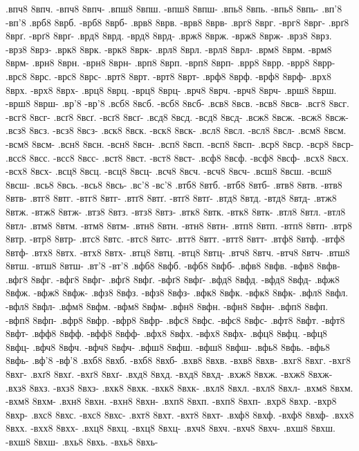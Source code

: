 {.впч8 8впч. -впч8 8впч-
.впш8 8впш. -впш8 8впш-
.впь8 8впь. -впь8 8впь-
.вп'8 -вп'8
.врб8 8врб. -врб8 8врб-
.врв8 8врв. -врв8 8врв-
.врг8 8врг. -врг8 8врг-
.врґ8 8врґ. -врґ8 8врґ-
.врд8 8врд. -врд8 8врд-
.врж8 8врж. -врж8 8врж-
.врз8 8врз. -врз8 8врз-
.врк8 8врк. -врк8 8врк-
.врл8 8врл. -врл8 8врл-
.врм8 8врм. -врм8 8врм-
.врн8 8врн. -врн8 8врн-
.врп8 8врп. -врп8 8врп-
.врр8 8врр. -врр8 8врр-
.врс8 8врс. -врс8 8врс-
.врт8 8врт. -врт8 8врт-
.врф8 8врф. -врф8 8врф-
.врх8 8врх. -врх8 8врх-
.врц8 8врц. -врц8 8врц-
.врч8 8врч. -врч8 8врч-
.врш8 8врш. -врш8 8врш-
.вр'8 -вр'8
.всб8 8всб. -всб8 8всб-
.всв8 8всв. -всв8 8всв-
.всг8 8всг. -всг8 8всг-
.всґ8 8всґ. -всґ8 8всґ-
.всд8 8всд. -всд8 8всд-
.всж8 8всж. -всж8 8всж-
.всз8 8всз. -всз8 8всз-
.вск8 8вск. -вск8 8вск-
.всл8 8всл. -всл8 8всл-
.всм8 8всм. -всм8 8всм-
.всн8 8всн. -всн8 8всн-
.всп8 8всп. -всп8 8всп-
.вср8 8вср. -вср8 8вср-
.всс8 8всс. -всс8 8всс-
.вст8 8вст. -вст8 8вст-
.всф8 8всф. -всф8 8всф-
.всх8 8всх. -всх8 8всх-
.всц8 8всц. -всц8 8всц-
.всч8 8всч. -всч8 8всч-
.всш8 8всш. -всш8 8всш-
.всь8 8всь. -всь8 8всь-
.вс'8 -вс'8
.втб8 8втб. -втб8 8втб-
.втв8 8втв. -втв8 8втв-
.втг8 8втг. -втг8 8втг-
.втґ8 8втґ. -втґ8 8втґ-
.втд8 8втд. -втд8 8втд-
.втж8 8втж. -втж8 8втж-
.втз8 8втз. -втз8 8втз-
.втк8 8втк. -втк8 8втк-
.втл8 8втл. -втл8 8втл-
.втм8 8втм. -втм8 8втм-
.втн8 8втн. -втн8 8втн-
.втп8 8втп. -втп8 8втп-
.втр8 8втр. -втр8 8втр-
.втс8 8втс. -втс8 8втс-
.втт8 8втт. -втт8 8втт-
.втф8 8втф. -втф8 8втф-
.втх8 8втх. -втх8 8втх-
.втц8 8втц. -втц8 8втц-
.втч8 8втч. -втч8 8втч-
.втш8 8втш. -втш8 8втш-
.вт'8 -вт'8
.вфб8 8вфб. -вфб8 8вфб-
.вфв8 8вфв. -вфв8 8вфв-
.вфг8 8вфг. -вфг8 8вфг-
.вфґ8 8вфґ. -вфґ8 8вфґ-
.вфд8 8вфд. -вфд8 8вфд-
.вфж8 8вфж. -вфж8 8вфж-
.вфз8 8вфз. -вфз8 8вфз-
.вфк8 8вфк. -вфк8 8вфк-
.вфл8 8вфл. -вфл8 8вфл-
.вфм8 8вфм. -вфм8 8вфм-
.вфн8 8вфн. -вфн8 8вфн-
.вфп8 8вфп. -вфп8 8вфп-
.вфр8 8вфр. -вфр8 8вфр-
.вфс8 8вфс. -вфс8 8вфс-
.вфт8 8вфт. -вфт8 8вфт-
.вфф8 8вфф. -вфф8 8вфф-
.вфх8 8вфх. -вфх8 8вфх-
.вфц8 8вфц. -вфц8 8вфц-
.вфч8 8вфч. -вфч8 8вфч-
.вфш8 8вфш. -вфш8 8вфш-
.вфь8 8вфь. -вфь8 8вфь-
.вф'8 -вф'8
.вхб8 8вхб. -вхб8 8вхб-
.вхв8 8вхв. -вхв8 8вхв-
.вхг8 8вхг. -вхг8 8вхг-
.вхґ8 8вхґ. -вхґ8 8вхґ-
.вхд8 8вхд. -вхд8 8вхд-
.вхж8 8вхж. -вхж8 8вхж-
.вхз8 8вхз. -вхз8 8вхз-
.вхк8 8вхк. -вхк8 8вхк-
.вхл8 8вхл. -вхл8 8вхл-
.вхм8 8вхм. -вхм8 8вхм-
.вхн8 8вхн. -вхн8 8вхн-
.вхп8 8вхп. -вхп8 8вхп-
.вхр8 8вхр. -вхр8 8вхр-
.вхс8 8вхс. -вхс8 8вхс-
.вхт8 8вхт. -вхт8 8вхт-
.вхф8 8вхф. -вхф8 8вхф-
.вхх8 8вхх. -вхх8 8вхх-
.вхц8 8вхц. -вхц8 8вхц-
.вхч8 8вхч. -вхч8 8вхч-
.вхш8 8вхш. -вхш8 8вхш-
.вхь8 8вхь. -вхь8 8вхь-
}

